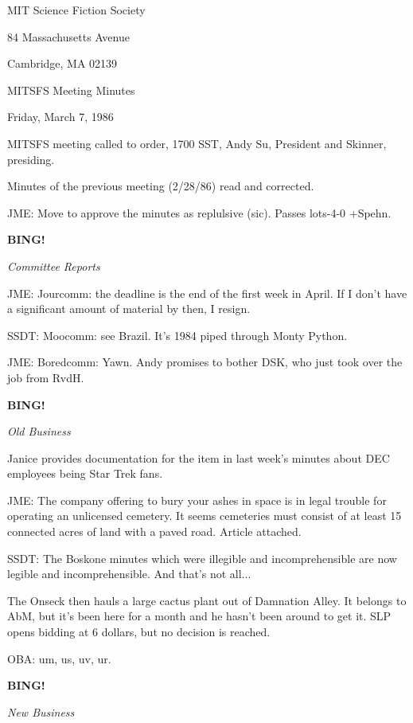 \documentclass[12pt]{article}
\newcommand{\bing}{{\bf BING!} }
\newcommand{\goto}[1]{\bing \vskip 12pt \centerline{{\em{#1}}}}
\begin{document}
\begin{center}

MIT Science Fiction Society 

84 Massachusetts Avenue

Cambridge, MA 02139

\vspace{12pt}

MITSFS Meeting Minutes 

Friday, March 7, 1986

\end{center}
 
\vspace{18pt}

\setlength{\parskip}{6pt}

\noindent
MITSFS meeting called to order, 1700 SST,
Andy Su, President and Skinner, presiding.

Minutes of the previous meeting (2/28/86) read and corrected.

JME: Move to approve the minutes as replulsive (sic). Passes lots-4-0 +Spehn.

\goto{Committee Reports}

JME: Jourcomm: the deadline is the end of the first week in April. If I don't have a significant amount of material by then, I resign.

SSDT: Moocomm: see Brazil. It's 1984 piped through Monty Python.

JME: Boredcomm: Yawn. Andy promises to bother DSK, who just took over the job from RvdH.

\goto{Old Business}

Janice provides documentation for the item in last week's minutes about DEC employees being Star Trek fans.

JME: The company offering to bury your ashes in space is in legal trouble for operating an unlicensed cemetery. It seems cemeteries must consist of at least 15 connected acres of land with a paved road. Article attached.

SSDT: The Boskone minutes which were illegible and incomprehensible are now legible and incomprehensible. And that's not all...

The Onseck then hauls a large cactus plant out of Damnation Alley. It belongs to AbM, but it's been here for a month and he hasn't been around to get it. SLP opens bidding at 6 dollars, but no decision is reached.

OBA: um, us, uv, ur.

\goto{New Business}
\end{document}
